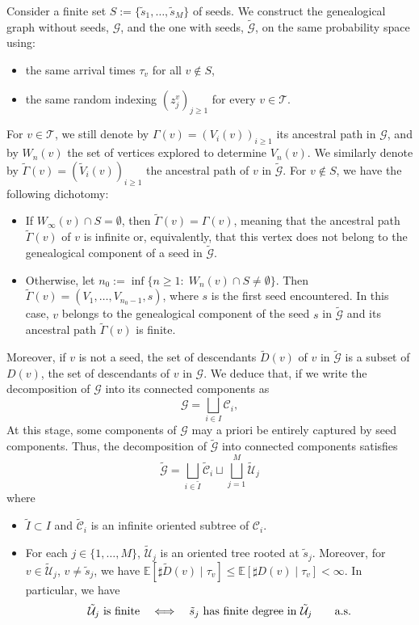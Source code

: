 \documentclass[french]{article}
\newcommand{\zi}{z}
\newcommand{\E}{\mathbb{E}}
\newcommand{\T}{\mathcal{T}}
\renewcommand{\1}{\mathds{1}}
\begin{document}
Consider a finite set \( S := \{\tilde{s}_1, \ldots, \tilde{s}_M\} \) of seeds.
We construct the genealogical graph without seeds, \( \mathcal{G} \), and the one with seeds, \( \tilde{\mathcal{G}} \), on the same probability space using:
\begin{itemize}
    \item the same arrival times \( \tau_v \) for all \( v \notin S \),
    \item the same random indexing \( (\zi_j^v)_{j \ge 1} \) for every \( v \in \T \).
\end{itemize}
For \( v \in \T \), we still denote by \( \Gamma(v) = (V_i(v))_{i \ge 1} \) its ancestral path in \( \mathcal{G} \), and by \( W_n(v) \) the set of vertices explored to determine \( V_n(v) \). We similarly denote by \( \tilde{\Gamma}(v) = (\tilde{V}_i(v))_{i \ge 1} \) the ancestral path of \( v \) in \( \tilde{\mathcal{G}} \). For \(v\notin S\), we have the following dichotomy:
\begin{itemize}
    \item If $W_\infty(v)\cap S =\emptyset$, then $\tilde{\Gamma}(v)=\Gamma(v)$, meaning that the ancestral path $\tilde{\Gamma}(v)$ of $v$ is infinite or, equivalently, that this vertex does not belong to the genealogical component of a seed in \( \tilde{\mathcal{G}} \).
    \item Otherwise, let $n_0:=\inf\{n\ge 1:\; W_n(v)\cap S\neq \emptyset\}$. Then $\tilde{\Gamma}(v)=(V_1,\ldots,V_{n_0-1},s)$, where $s$ is the first seed encountered. In this case, $v$ belongs to the genealogical component of the seed $s$ in \( \tilde{\mathcal{G}} \) and its ancestral path $\tilde{\Gamma}(v)$ is finite.
\end{itemize}
Moreover, if $v$ is not a seed, the set of descendants $\tilde{D}(v)$ of $v$ in $\tilde{\mathcal{G}}$ is a subset of $D(v)$, the set of descendants of $v$ in $\mathcal{G}$.
We deduce that, if we write the decomposition of $\mathcal G$ into its connected components as
$$
\mathcal G = \bigsqcup_{i \in I} \mathcal{C}_i,
$$
At this stage, some components of $\mathcal G$ may a priori be entirely captured by seed components. Thus, the decomposition of $\tilde{\mathcal{G}}$ into connected components satisfies
$$
\tilde{\mathcal G} = \bigsqcup_{i \in \tilde I} \tilde{\mathcal{C}}_i \sqcup \bigsqcup_{j = 1}^M\tilde{\mathcal{U}}_j
$$
where 
\begin{itemize}
    \item $\tilde I\subset I$ and $\tilde{\mathcal{C}}_i$ is an infinite oriented subtree of $\mathcal{C}_i$.
    \item For each $j\in \{1,\ldots, M\}$, $\tilde{\mathcal{U}}_j$ is an oriented tree rooted at $\tilde{s}_j$. Moreover, for $v \in \tilde{\mathcal{U}}_j$, $v \neq \tilde{s}_j$, we have $\E[\sharp\tilde{D}(v) \mid \tau_v] \le \E[\sharp D(v) \mid \tau_v] <\infty$. In particular, we have
    $$
    \hbox{$\tilde{\mathcal{U}}_j$ is finite} \quad \Longleftrightarrow \quad \hbox{$\tilde{s}_j$ has finite degree in $\tilde{\mathcal{U}}_j$}\qquad\hbox{a.s.}
    $$    
\end{itemize}
\end{document}
